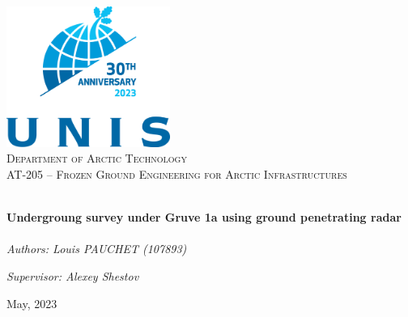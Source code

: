 \begin{titlepage}
\vbox{}
\vbox{}
\begin{center}
\includegraphics[width=0.40\textwidth]{Images/UNIS_logo.png}\\[2cm]
\textsc{\LARGE Department of Arctic Technology}\\[1.5cm]
\textsc{\Large AT-205 -- Frozen Ground Engineering for Arctic Infrastructures}\\[0.5cm]
\vbox{}

\HRule \\[0.5cm]
{ \huge \bfseries Undergroung survey under Gruve 1a using ground penetrating radar }\\[0.5cm]
\HRule \\[1.5cm]

\large
\emph{Authors: Louis PAUCHET (107893)} 

\emph{Supervisor: Alexey Shestov} 

\vspace{2.5cm}

{\large May, 2023}

\vfill


\end{center}

\doclicenseThis

\end{titlepage}